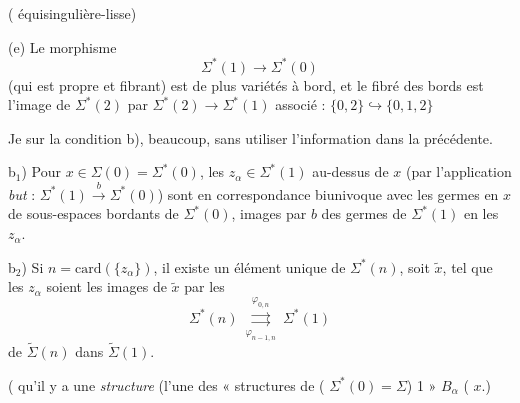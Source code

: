 \documentclass[11pt,a4paper]{article}
\begin{document}

(  \struck{\ill{} \ill{}} équisingulière-lisse)

(e) \struck{\ill{}} Le morphisme 
\[
\Sigma^{*}(1)\longrightarrow\Sigma^{*}(0)
\]
(qui est propre et fibrant) est de plus   variétés à bord, et le fibré des bords est  l'image de $\Sigma^{*}(2)$ par $\Sigma^{*}(2)\to\Sigma^{*}(1)$ associé : $\lbrace 0,2\rbrace\hookrightarrow\lbrace 0,1,2\rbrace$


\struck{\ill{}} Je  sur la condition b),  beaucoup, sans  utiliser  l'information  dans la  précédente.

b$_1$) Pour $x\in\Sigma(0)=\Sigma^{*}(0)$, les $z_\alpha\in\Sigma^{*}(1)$ au-dessus de $x$ (par l'application \emph{but} : $\Sigma^{*}(1)\xrightarrow{\ b\ }\Sigma^{*}(0)$) sont en correspondance biunivoque avec les germes  en $x$ de sous-espaces bordants de $\Sigma^{*}(0)$, \struck{\ill{}} images par $b$ des germes de $\Sigma^{*}(1)$ en les $z_\alpha$.

b$_2$)  Si $n=\mathrm{card}(\lbrace z_\alpha\rbrace)$, il existe un élément \struck{\ill{}} unique de $\Sigma^{*}(n)$, soit $\tilde x$, tel que les $z_\alpha$ soient les images de $\tilde x$ par les 
\[
\Sigma^{*}(n)\ \overset{\varphi_{0,n}}{\underset{\varphi_{n-1,n}}{\rightrightarrows}}\ \Sigma^{*}(1)
\]
de $\widetilde\Sigma(n)$ dans $\widetilde\Sigma(1)$.

( qu'il y a une \emph{structure} (l'une des « structures de \ill{}  (\ill{}   $\Sigma^{*}(0)=\Sigma$) \ill{} 1 » $B_\alpha$ ( $x$.)
\end{document}
